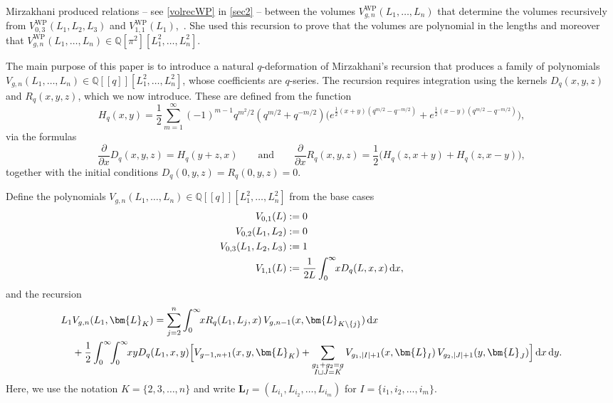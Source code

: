 \documentclass[a4paper]{article}
\theoremstyle{plain}
\theoremstyle{definition}
\newcommand{\dd}{\mathrm{d}}
\newcommand{\LL}{\bm{L}}
\newcommand{\bq}{\mathbb{Q}}
\begin{document}
Mirzakhani produced relations -- see \cref{volrecWP} in \cref{sec2} -- between the volumes $V^{\mathrm{WP}}_{g,n}(L_1, \ldots, L_n)$ that determine the volumes recursively from $V^{\mathrm{WP}}_{0,3}(L_1,L_2,L_3)$ and $V^{\mathrm{WP}}_{1,1}(L_1)$,~\cite{MirSim}. She used this recursion to prove that the volumes are polynomial in the lengths and moreover that $V^{\mathrm{WP}}_{g,n}(L_1, \ldots, L_n) \in \bq[\pi^2][L_1^2, \ldots, L_n^2]$.


The main purpose of this paper is to introduce a natural $q$-deformation of Mirzakhani's recursion that produces a family of polynomials $V_{g,n}(L_1, \ldots, L_n) \in \bq[[q]][L_1^2, \ldots, L_n^2]$, whose coefficients are $q$-series. The recursion requires integration using the kernels $D_q(x,y,z)$ and $R_q(x,y,z)$, which we now introduce. These are defined from the function
\begin{equation} \label{Hq}
H_q(x,y) = \frac{1}{2} \sum_{m=1}^\infty(-1)^{m-1} q^{m^2/2} (q^{m/2} + q^{-m/2}) \Big(e^{\frac{1}{2}(x+y) (q^{m/2}-q^{-m/2})} + e^{\frac{1}{2}(x-y) (q^{m/2}-q^{-m/2})} \Big),
\end{equation}
via the formulas
\[
\frac{\partial}{\partial x} D_q(x,y,z) = H_q(y+z,x) \qquad \text{and} \qquad \frac{\partial}{\partial x} R_q(x,y,z) = \frac{1}{2} \big( H_q(z,x+y) + H_q(z,x-y) \big),
\]
together with the initial conditions $D_q(0,y,z) = R_q(0,y,z) = 0$.


Define the polynomials $V_{g,n}(L_1, \ldots, L_n) \in\bq[[q]][L_1^2, \ldots, L_n^2]$ from the base cases
\begin{align}
V_{0,1}(L) &:= 0 \notag \\
V_{0,2}(L_1, L_2) &:= 0 \notag \\
V_{0,3}(L_1,L_2,L_3) &:= 1 \notag \\
V_{1,1}(L) &:= \frac{1}{2L} \int_0^\infty \!\! xD_q(L,x,x) \, \dd x, \label{v11}
\end{align}
and the recursion
\begin{align} 
L_1&V_{g,n}(L_1, \LL_K)=\sum_{j=2}^n\int_0^\infty \!\! x R_q(L_1,L_j,x) \, V_{g,n-1}(x, \LL_{K \setminus \{j\}}) \, \dd x \notag \\
&+ \frac{1}{2} \int_0^\infty \!\! \int_0^\infty \!\! xy D_q(L_1, x, y) \Big[V_{g-1,n+1}(x, y, \LL_K) + \sum_{\substack{g_1+g_2=g \\ I \sqcup J = K}} V_{g_1,|I|+1}(x, \LL_I) \, V_{g_2,|J|+1}(y, \LL_J) \Big] \, \dd x \, \dd y. \label{qvolrec}
\end{align}
Here, we use the notation $K = \{2, 3, \ldots, n\}$ and write $\LL_I = (L_{i_1}, L_{i_2}, \ldots, L_{i_m})$ for $I = \{i_1, i_2, \ldots, i_m\}$.
\end{document}
